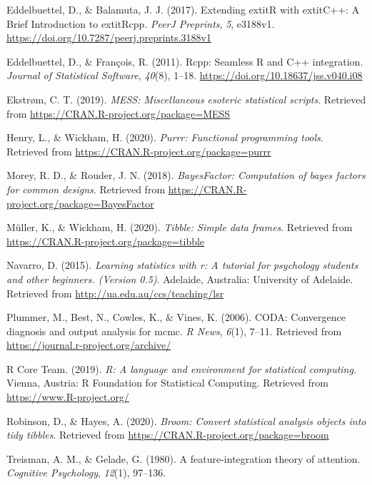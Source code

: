 \documentclass[
  english,
  man]{apa6}
\begin{document}
\leavevmode\hypertarget{ref-R-Rcpp_b}{}%
Eddelbuettel, D., \& Balamuta, J. J. (2017). Extending extitR with extitC++: A Brief Introduction to extitRcpp. \emph{PeerJ Preprints}, \emph{5}, e3188v1. \url{https://doi.org/10.7287/peerj.preprints.3188v1}

\leavevmode\hypertarget{ref-R-Rcpp_a}{}%
Eddelbuettel, D., \& François, R. (2011). Rcpp: Seamless R and C++ integration. \emph{Journal of Statistical Software}, \emph{40}(8), 1--18. \url{https://doi.org/10.18637/jss.v040.i08}

\leavevmode\hypertarget{ref-R-MESS}{}%
Ekstrøm, C. T. (2019). \emph{MESS: Miscellaneous esoteric statistical scripts}. Retrieved from \url{https://CRAN.R-project.org/package=MESS}

\leavevmode\hypertarget{ref-R-purrr}{}%
Henry, L., \& Wickham, H. (2020). \emph{Purrr: Functional programming tools}. Retrieved from \url{https://CRAN.R-project.org/package=purrr}

\leavevmode\hypertarget{ref-R-BayesFactor}{}%
Morey, R. D., \& Rouder, J. N. (2018). \emph{BayesFactor: Computation of bayes factors for common designs}. Retrieved from \url{https://CRAN.R-project.org/package=BayesFactor}

\leavevmode\hypertarget{ref-R-tibble}{}%
Müller, K., \& Wickham, H. (2020). \emph{Tibble: Simple data frames}. Retrieved from \url{https://CRAN.R-project.org/package=tibble}

\leavevmode\hypertarget{ref-R-lsr}{}%
Navarro, D. (2015). \emph{Learning statistics with r: A tutorial for psychology students and other beginners. (Version 0.5)}. Adelaide, Australia: University of Adelaide. Retrieved from \url{http://ua.edu.au/ccs/teaching/lsr}

\leavevmode\hypertarget{ref-R-coda}{}%
Plummer, M., Best, N., Cowles, K., \& Vines, K. (2006). CODA: Convergence diagnosis and output analysis for mcmc. \emph{R News}, \emph{6}(1), 7--11. Retrieved from \url{https://journal.r-project.org/archive/}

\leavevmode\hypertarget{ref-R-base}{}%
R Core Team. (2019). \emph{R: A language and environment for statistical computing}. Vienna, Austria: R Foundation for Statistical Computing. Retrieved from \url{https://www.R-project.org/}

\leavevmode\hypertarget{ref-R-broom}{}%
Robinson, D., \& Hayes, A. (2020). \emph{Broom: Convert statistical analysis objects into tidy tibbles}. Retrieved from \url{https://CRAN.R-project.org/package=broom}

\leavevmode\hypertarget{ref-treisman1980feature}{}%
Treisman, A. M., \& Gelade, G. (1980). A feature-integration theory of attention. \emph{Cognitive Psychology}, \emph{12}(1), 97--136.
\end{document}
